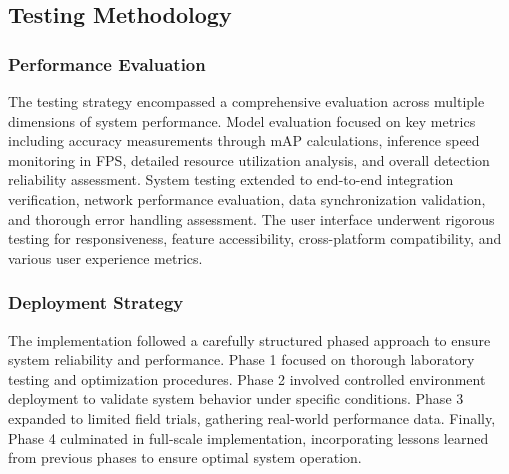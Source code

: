 \subsection{Testing Methodology}

\subsubsection{Performance Evaluation}
The testing strategy encompassed a comprehensive evaluation across multiple dimensions of system performance. Model evaluation focused on key metrics including accuracy measurements through mAP calculations, inference speed monitoring in FPS, detailed resource utilization analysis, and overall detection reliability assessment. System testing extended to end-to-end integration verification, network performance evaluation, data synchronization validation, and thorough error handling assessment. The user interface underwent rigorous testing for responsiveness, feature accessibility, cross-platform compatibility, and various user experience metrics.

\subsubsection{Deployment Strategy}
The implementation followed a carefully structured phased approach to ensure system reliability and performance. Phase 1 focused on thorough laboratory testing and optimization procedures. Phase 2 involved controlled environment deployment to validate system behavior under specific conditions. Phase 3 expanded to limited field trials, gathering real-world performance data. Finally, Phase 4 culminated in full-scale implementation, incorporating lessons learned from previous phases to ensure optimal system operation.